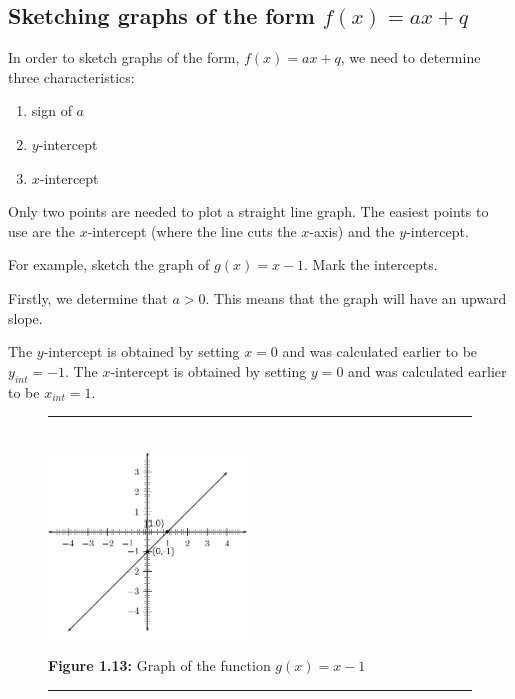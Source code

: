 \subsection*{Sketching graphs of the form $f(x)=ax+q$}
\nopagebreak
In order to sketch graphs of the form, $f(x)=ax+q$, we need to determine three characteristics:\par 
\begin{enumerate}[noitemsep, label=\textbf{\arabic*}. ] 
\item sign of $a$
\item $y$-intercept
\item $x$-intercept
\end{enumerate}
Only two points are needed to plot a straight line graph. The easiest points to use are the $x$-intercept (where the line cuts the $x$-axis) and the $y$-intercept.\par 
For example, sketch the graph of $g(x)=x-1$. Mark the intercepts.\par 
Firstly, we determine that $a>0$. This means that the graph will have an upward slope.\par 
The $y$-intercept is obtained by setting $x=0$ and was calculated earlier to be ${y}_{int}=-1$. The $x$-intercept is obtained by setting $y=0$ and was calculated earlier to be ${x}_{int}=1$.\par 

\setcounter{subfigure}{0}
\begin{figure}[H] %
\begin{center}
\rule[.1in]{\figurerulewidth}{.005in} \\
\label{m39338*uid93!!!underscore!!!media}\label{m39338*uid93!!!underscore!!!printimage}\includegraphics[width=200px]{col11306.imgs/m39338_MG10C11_010.png} %
\vspace{2pt}
\vspace{\rubberspace}\par \begin{cnxcaption}
\small \textbf{Figure 1.13: }Graph of the function $g(x)=x-1$
\end{cnxcaption}
\vspace{.1in}
\rule[.1in]{\figurerulewidth}{.005in} \\
\end{center}
\end{figure}       

